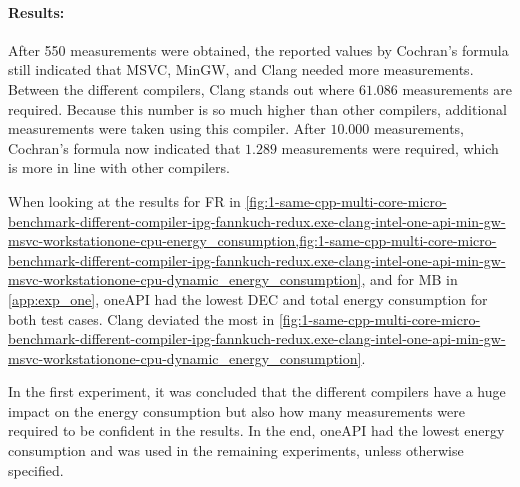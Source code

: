 \paragraph{Results:} After 550 measurements were obtained, the reported values by Cochran's formula still indicated that MSVC, MinGW, and Clang needed more measurements. Between the different compilers, Clang stands out where $61.086$ measurements are required. Because this number is so much higher than other compilers, additional measurements were taken using this compiler. After $10.000$ measurements, Cochran's formula now indicated that $1.289$ measurements were required, which is more in line with other compilers.



When looking at the results for FR in \cref{fig:1-same-cpp-multi-core-micro-benchmark-different-compiler-ipg-fannkuch-redux.exe-clang-intel-one-api-min-gw-msvc-workstationone-cpu-energy_consumption,fig:1-same-cpp-multi-core-micro-benchmark-different-compiler-ipg-fannkuch-redux.exe-clang-intel-one-api-min-gw-msvc-workstationone-cpu-dynamic_energy_consumption}, and for MB in \cref{app:exp_one}, oneAPI had the lowest DEC and total energy consumption for both test cases. Clang deviated the most in \cref{fig:1-same-cpp-multi-core-micro-benchmark-different-compiler-ipg-fannkuch-redux.exe-clang-intel-one-api-min-gw-msvc-workstationone-cpu-dynamic_energy_consumption}.

In the first experiment, it was concluded that the different compilers have a huge impact on the energy consumption but also how many measurements were required to be confident in the results. In the end, oneAPI had the lowest energy consumption and was used in the remaining experiments, unless otherwise specified.



